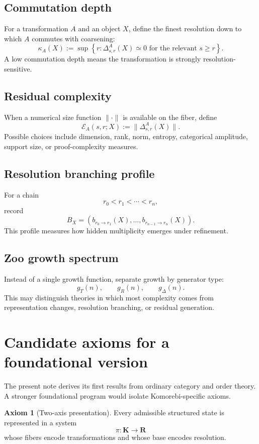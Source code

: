 \documentclass[11pt]{article}
\theoremstyle{definition}
\newtheorem{axiom}[theorem]{Axiom}
\theoremstyle{remark}
\newcommand{\K}{\mathbf K}
\newcommand{\Rcat}{\mathbf R}
\begin{document}
\subsection{Commutation depth}

For a transformation $A$ and an object $X$, define the finest resolution down to which $A$ commutes with coarsening:
\[
\kappa_A(X)
:=
\sup\left\{r:
\Delta^A_{s,r}(X)\simeq0
\text{ for the relevant }s\ge r
\right\}.
\]
A low commutation depth means the transformation is strongly resolution-sensitive.

\subsection{Residual complexity}

When a numerical size function $\|\cdot\|$ is available on the fiber, define
\[
\mathcal E_A(s,r;X):=\|\Delta^A_{s,r}(X)\|.
\]
Possible choices include dimension, rank, norm, entropy, categorical amplitude, support size, or proof-complexity measures.

\subsection{Resolution branching profile}

For a chain
\[
r_0<r_1<\cdots<r_n,
\]
record
\[
B_X=(b_{r_0\to r_1}(X),\ldots,b_{r_{n-1}\to r_n}(X)).
\]
This profile measures how hidden multiplicity emerges under refinement.

\subsection{Zoo growth spectrum}

Instead of a single growth function, separate growth by generator type:
\[
g_T(n),\qquad g_R(n),\qquad g_\Delta(n).
\]
This may distinguish theories in which most complexity comes from representation changes, resolution branching, or residual generation.

\section{Candidate axioms for a foundational version}

The present note derives its first results from ordinary category and order theory. A stronger foundational program would isolate Komorebi-specific axioms.

\begin{axiom}[Two-axis presentation]
Every admissible structured state is represented in a system
\[
\pi:\K\to\Rcat
\]
whose fibers encode transformations and whose base encodes resolution.
\end{axiom}
\end{document}
